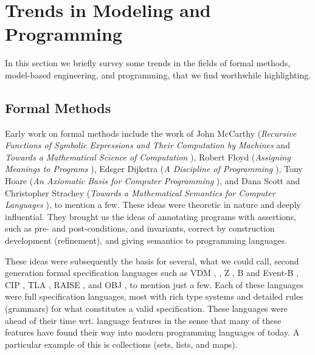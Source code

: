 
\section{Trends in Modeling and Programming}
\label{sec:trends}

In this section we briefly survey some trends in the fields of
formal methods, model-based engineering, and programming, that we find worthwhile highlighting.


\subsection{Formal Methods}

Early work on formal methods include the work of John McCarthy 
({\em Recursive Functions of Symbolic Expressions and Their 
Computation by Machines} \cite{Mc60} and 
{\em Towards a Mathematical Science of Computation} \cite{Mc62a}), 
Robert Floyd ({\em Assigning Meanings to Programs} \cite{Flo67}), 
Edsger Dijkstra ({\em A Discipline of Programming} \cite{EWD1}), 
Tony Hoare ({\em An Axiomatic Basis for Computer Programming} 
\cite{Hoa69}), and Dana Scott and Christopher 
Strachey ({\em Towards a Mathematical Semantics for Computer 
Languages} \cite{Sco71}), to mention a few. These ideas were 
theoretic in nature and deeply influential. They brought us the 
ideas of  annotating programs with assertions, such as pre- and 
post-conditions, and invariants, correct by construction 
development (refinement), and giving semantics to programming 
languages. 

These ideas were subsequently the basis for several, what we could 
call, second generation formal specification languages such as 
VDM 
\cite{vdm78,bjoerner-jones-82,jones90,jones-shaw-90},  
\vdmpp{} \cite{vdmplusplus05},
Z \cite{Spivey-Z-92}, B and Event-B \cite{abrial-eventb-10}, CIP 
\cite{cip-1985}, TLA \cite{lamport-TLA-1994}, RAISE 
\cite{raise92,george-raise-2008},
and OBJ 
\cite{futatsugi-obj-1985}, to mention just a few. Each of these 
languages were full 
specification languages, most with rich type systems and detailed 
rules (grammars) for what constitutes a valid specification. These 
languages were ahead of their time wrt. language features in the 
sense that many of these features have found their 
way into modern programming languages of today. A particular
example of this is collections (sets, lists, and maps).

